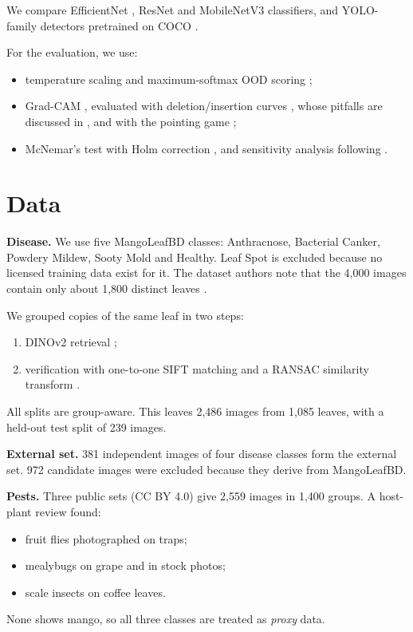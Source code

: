 \documentclass[conference]{IEEEtran}
\begin{document}
We compare EfficientNet \cite{tan2019efficientnet}, ResNet \cite{he2016resnet} and MobileNetV3
\cite{howard2019mobilenetv3} classifiers, and YOLO-family detectors \cite{redmon2016yolo,jocher2023ultralytics}
pretrained on COCO \cite{lin2014coco}.

For the evaluation, we use:
\begin{itemize}
\item temperature scaling \cite{guo2017calibration} and maximum-softmax OOD scoring \cite{hendrycks2017baseline};
\item Grad-CAM \cite{selvaraju2017gradcam}, evaluated with deletion/insertion curves \cite{petsiuk2018rise}, whose
pitfalls are discussed in \cite{hooker2019roar}, and with the pointing game \cite{zhang2018excitation};
\item McNemar's test \cite{dietterich1998tests} with Holm correction \cite{holm1979}, and sensitivity analysis
following \cite{saltelli2008gsa}.
\end{itemize}

\section{Data}
\textbf{Disease.} We use five MangoLeafBD classes: Anthracnose, Bacterial Canker, Powdery Mildew, Sooty Mold and
Healthy. Leaf Spot is excluded because no licensed training data exist for it. The dataset authors note that the
4{,}000 images contain only about 1{,}800 distinct leaves \cite{ahmed2023mangoleafbd}.

We grouped copies of the same leaf in two steps:
\begin{enumerate}
\item DINOv2 retrieval \cite{oquab2024dinov2};
\item verification with one-to-one SIFT matching \cite{lowe2004sift} and a RANSAC similarity transform
\cite{fischler1981ransac}.
\end{enumerate}
All splits are group-aware. This leaves 2{,}486 images from 1{,}085 leaves, with a held-out test split of 239 images.

\textbf{External set.} 381 independent images of four disease classes form the external set. 972 candidate images
were excluded because they derive from MangoLeafBD.

\textbf{Pests.} Three public sets (CC BY 4.0) give 2{,}559 images in 1{,}400 groups. A host-plant review found:
\begin{itemize}
\item fruit flies photographed on traps;
\item mealybugs on grape and in stock photos;
\item scale insects on coffee leaves.
\end{itemize}
None shows mango, so all three classes are treated as \emph{proxy} data.
\end{document}
